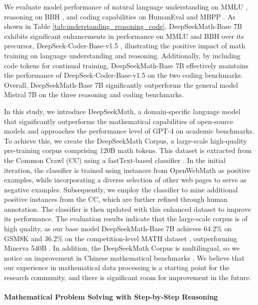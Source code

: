 We evaluate model performance of natural language understanding on MMLU \citep{mmlu}, reasoning on BBH \citep{bbh}, and coding capabilities on HumanEval \citep{codex} and MBPP \citep{mbpp}. As shown in Table \ref{tab:understanding_reasoning_code}, DeepSeekMath-Base 7B exhibits significant enhancements in performance on MMLU and BBH over its precursor, DeepSeek-Coder-Base-v1.5 \citep{deepseek-coder}, illustrating the positive impact of math training on language understanding and reasoning. Additionally, by including code tokens for continual training, DeepSeekMath-Base 7B effectively maintains the performance of DeepSeek-Coder-Base-v1.5 on the two coding benchmarks. Overall, DeepSeekMath-Base 7B significantly outperforms the general model Mistral 7B \citep{mistral} on the three reasoning and coding benchmarks.

In this study, we introduce DeepSeekMath, a domain-specific language model that significantly outperforms the mathematical capabilities of open-source models and approaches the performance level of GPT-4 on academic benchmarks. To achieve this, we create the DeepSeekMath Corpus, a large-scale high-quality pre-training corpus comprising 120B math tokens. This dataset is extracted from the Common Crawl (CC) using a fastText-based classifier \citep{joulin2016fasttext}. In the initial iteration, the classifier is trained using instances from OpenWebMath \citep{openwebmath} as positive examples, while incorporating a diverse selection of other web pages to serve as negative examples. Subsequently, we employ the classifier to mine additional positive instances from the CC, which are further refined through human annotation. The classifier is then updated with this enhanced dataset to improve its performance. The evaluation results indicate that the large-scale corpus is of high quality, as our base model DeepSeekMath-Base 7B achieves 64.2\% on GSM8K \citep{gsm8k} and 36.2\% on the competition-level MATH dataset \citep{MATH}, outperforming Minerva 540B \citep{minerva}. In addition, the DeepSeekMath Corpus is multilingual, so we notice an improvement in Chinese mathematical benchmarks \citep{wei2023cmath,agieval}. We believe that our experience in mathematical data processing is a starting point for the research community, and there is significant room for improvement in the future.

\paragraph{Mathematical Problem Solving with Step-by-Step Reasoning}

